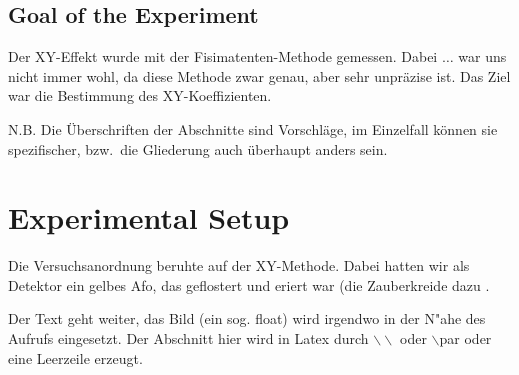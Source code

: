 \documentclass[12pt, a4paper]{article}
\begin{document}
\subsection{Goal of the Experiment}
Der XY-Effekt wurde mit der Fisimatenten-Methode gemessen. Dabei $\ldots$ 
war uns nicht immer wohl, da diese Methode zwar genau, aber sehr unpr\"azise 
ist. Das Ziel war die Bestimmung des XY-Koeffizienten. 

N.B. Die \"Uberschriften der Abschnitte sind Vorschl\"age, im Einzelfall 
k\"onnen sie spezifischer, bzw.\ 
die Gliederung auch \"uberhaupt anders sein.

\section{Experimental Setup}

Die Versuchsanordnung beruhte auf der XY-Methode. Dabei hatten wir als
Detektor ein gelbes Afo, das geflostert und eriert war \cite{afo} (die Zauberkreide dazu .

Der Text geht weiter, das Bild (ein sog. float) wird irgendwo in der N"ahe des
Aufrufs eingesetzt. Der Abschnitt hier wird in Latex durch 
$\backslash\backslash$ oder $\backslash$par
oder eine Leerzeile erzeugt.
\end{document}
